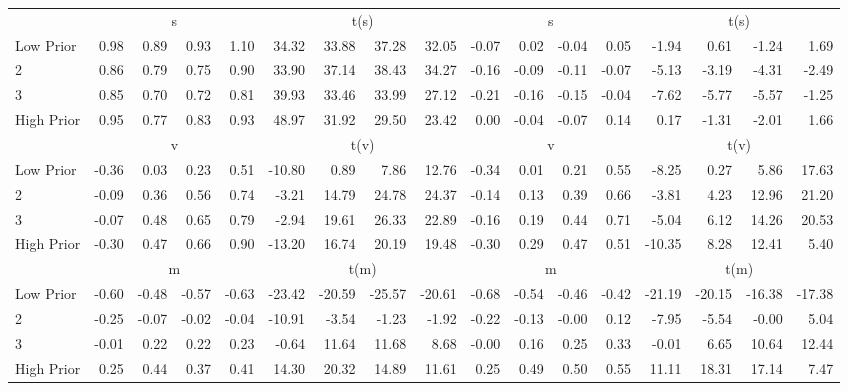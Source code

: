 \begin{table}[!ht]
\begin{tabular}{lrrrrrrrrrrrrrrrr}
  
     & \multicolumn{4}{c}{s} & \multicolumn{4}{c}{t(s)}  & \multicolumn{4}{c}{s} & \multicolumn{4}{c}{t(s)}   \\
     \cmidrule(r){2-5} \cmidrule(r){6-9}  \cmidrule(r){10-13} \cmidrule(r){14-17} 
    Low Prior  & 0.98  & 0.89  & 0.93  & 1.10  & 34.32  & 33.88  & 37.28  & 32.05  & -0.07  & 0.02  & -0.04  & 0.05  & -1.94  & 0.61  & -1.24  & 1.69   \\
    2  & 0.86  & 0.79  & 0.75  & 0.90  & 33.90  & 37.14  & 38.43  & 34.27  & -0.16  & -0.09  & -0.11  & -0.07  & -5.13  & -3.19  & -4.31  & -2.49   \\
    3  & 0.85  & 0.70  & 0.72  & 0.81  & 39.93  & 33.46  & 33.99  & 27.12  & -0.21  & -0.16  & -0.15  & -0.04  & -7.62  & -5.77  & -5.57  & -1.25   \\
    High Prior  & 0.95  & 0.77  & 0.83  & 0.93  & 48.97  & 31.92  & 29.50  & 23.42  & 0.00  & -0.04  & -0.07  & 0.14  & 0.17  & -1.31  & -2.01  & 1.66   \\
    
  
     & \multicolumn{4}{c}{v} & \multicolumn{4}{c}{t(v)}  & \multicolumn{4}{c}{v} & \multicolumn{4}{c}{t(v)}   \\
     \cmidrule(r){2-5} \cmidrule(r){6-9}  \cmidrule(r){10-13} \cmidrule(r){14-17} 
    Low Prior  & -0.36  & 0.03  & 0.23  & 0.51  & -10.80  & 0.89  & 7.86  & 12.76  & -0.34  & 0.01  & 0.21  & 0.55  & -8.25  & 0.27  & 5.86  & 17.63   \\
    2  & -0.09  & 0.36  & 0.56  & 0.74  & -3.21  & 14.79  & 24.78  & 24.37  & -0.14  & 0.13  & 0.39  & 0.66  & -3.81  & 4.23  & 12.96  & 21.20   \\
    3  & -0.07  & 0.48  & 0.65  & 0.79  & -2.94  & 19.61  & 26.33  & 22.89  & -0.16  & 0.19  & 0.44  & 0.71  & -5.04  & 6.12  & 14.26  & 20.53   \\
    High Prior  & -0.30  & 0.47  & 0.66  & 0.90  & -13.20  & 16.74  & 20.19  & 19.48  & -0.30  & 0.29  & 0.47  & 0.51  & -10.35  & 8.28  & 12.41  & 5.40   \\
    
  
     & \multicolumn{4}{c}{m} & \multicolumn{4}{c}{t(m)}  & \multicolumn{4}{c}{m} & \multicolumn{4}{c}{t(m)}   \\
     \cmidrule(r){2-5} \cmidrule(r){6-9}  \cmidrule(r){10-13} \cmidrule(r){14-17} 
    Low Prior  & -0.60  & -0.48  & -0.57  & -0.63  & -23.42  & -20.59  & -25.57  & -20.61  & -0.68  & -0.54  & -0.46  & -0.42  & -21.19  & -20.15  & -16.38  & -17.38   \\
    2  & -0.25  & -0.07  & -0.02  & -0.04  & -10.91  & -3.54  & -1.23  & -1.92  & -0.22  & -0.13  & -0.00  & 0.12  & -7.95  & -5.54  & -0.00  & 5.04   \\
    3  & -0.01  & 0.22  & 0.22  & 0.23  & -0.64  & 11.64  & 11.68  & 8.68  & -0.00  & 0.16  & 0.25  & 0.33  & -0.01  & 6.65  & 10.64  & 12.44   \\
    High Prior  & 0.25  & 0.44  & 0.37  & 0.41  & 14.30  & 20.32  & 14.89  & 11.61  & 0.25  & 0.49  & 0.50  & 0.55  & 11.11  & 18.31  & 17.14  & 7.47   \\
    

\end{tabular}
\end{table}
